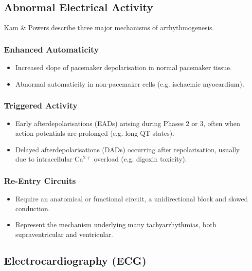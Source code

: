 \documentclass[11pt,a4paper]{article}
\begin{document}
\subsection{Abnormal Electrical Activity}

Kam \& Powers describe three major mechanisms of arrhythmogenesis.

\subsubsection{Enhanced Automaticity}

\begin{itemize}
  \item Increased slope of pacemaker depolarisation in normal pacemaker tissue.
  \item Abnormal automaticity in non-pacemaker cells (e.g. ischaemic myocardium).
\end{itemize}

\subsubsection{Triggered Activity}

\begin{itemize}
  \item Early afterdepolarisations (EADs) arising during Phases 2 or 3, often when action potentials are prolonged (e.g. long QT states).
  \item Delayed afterdepolarisations (DADs) occurring after repolarisation, usually due to intracellular Ca$^{2+}$ overload (e.g. digoxin toxicity).
\end{itemize}

\subsubsection{Re-Entry Circuits}

\begin{itemize}
  \item Require an anatomical or functional circuit, a unidirectional block and slowed conduction.
  \item Represent the mechanism underlying many tachyarrhythmias, both supraventricular and ventricular.
\end{itemize}

\subsection{Electrocardiography (ECG)}
\end{document}
